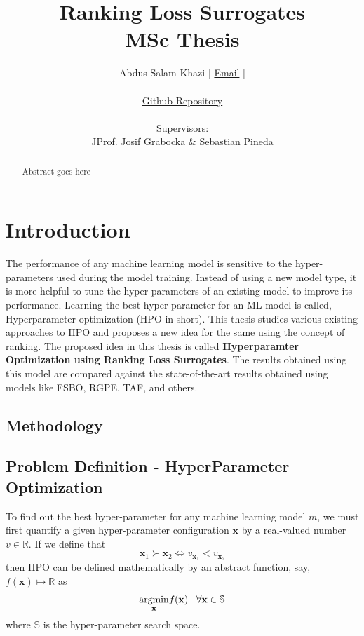 \documentclass[11pt]{report}
\title {Ranking Loss Surrogates \\[1ex] \large MSc Thesis}
\author{
        Abdus Salam Khazi [
        \href{mailto:abdus.khazi@students.uni-freiburg.de}
                {Email} ]\\ \\
        \href{https://github.com/abduskhazi/ranking-loss-surrogates.git}
                {Github Repository} \cite{github_repository} \\ \\
        Supervisors:
        \begin{tabular}{ll}
             JProf. Josif Grabocka \&
			Sebastian Pineda
		\end{tabular}
       }
\begin{document}


\maketitle
\date{}

\newpage
{}
\begin{abstract}

Abstract goes here

\end{abstract}

\newpage

\tableofcontents
\newpage
\newpage


\chapter{Introduction}

The performance of any machine learning model is sensitive to the hyper-parameters used during the model training. 
Instead of using a new model type, it is more helpful to tune the hyper-parameters of an existing model to improve its performance.
Learning the best hyper-parameter for an ML model is called, Hyperparameter optimization (HPO in short).
This thesis studies various existing approaches to HPO and proposes a new idea for the same using the concept of ranking.
The proposed idea in this thesis is called \textbf{Hyperparamter Optimization using Ranking Loss Surrogates}. 
The results obtained using this model are compared against the state-of-the-art results obtained using models like FSBO,  RGPE,  TAF, and others. 

\section{Methodology}

\section{Problem Definition - HyperParameter Optimization}
To find out the best hyper-parameter for any machine learning model $m$, we must first quantify a given hyper-parameter configuration $\textbf{x}$ by a real-valued number $v \in \mathbb{R}$.
If we define that
$$
\textbf{x}_1 \succ  \textbf{x}_2 \iff v_{\textbf{x}_1} < v_{\textbf{x}_2}
$$
then HPO can be defined mathematically by an abstract function, say,  $f(\textbf{x}) \mapsto \mathbb{R}$ as
$$
     \underset{\rm \textbf{x}}{\rm argmin}  f(\textbf{x}) \;\;\;  \forall \textbf{x} \in \mathbb{S}
$$
where $\mathbb{S}$ is the hyper-parameter search space.
\end{document}
